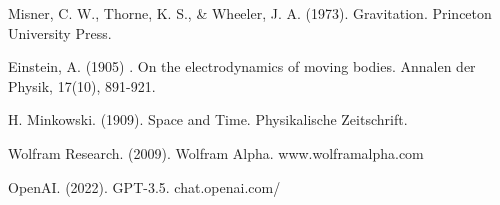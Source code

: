 \documentclass{article}
\begin{document}
\begin{thebibliography}{11}

Misner, C. W., Thorne, K. S., \& Wheeler, J. A. (1973). Gravitation. Princeton University Press.

 Einstein, A. (1905) . On the electrodynamics of moving bodies. Annalen der Physik, 17(10), 891-921.

H. Minkowski. (1909). Space and Time. Physikalische Zeitschrift.

Wolfram Research. (2009). Wolfram Alpha. www.wolframalpha.com

OpenAI. (2022). GPT-3.5. chat.openai.com/










\end{thebibliography}
\end{document}
